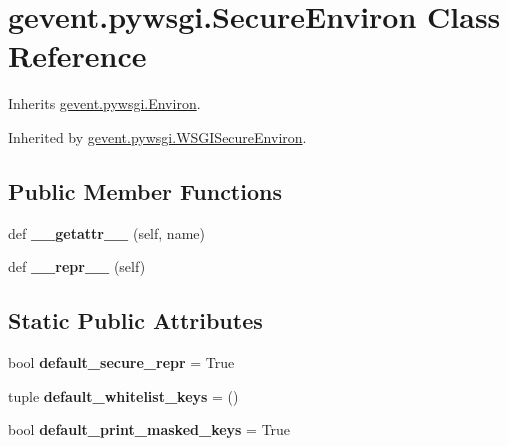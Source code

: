 \hypertarget{classgevent_1_1pywsgi_1_1_secure_environ}{}\section{gevent.\+pywsgi.\+Secure\+Environ Class Reference}
\label{classgevent_1_1pywsgi_1_1_secure_environ}


Inherits \hyperlink{classgevent_1_1pywsgi_1_1_environ}{gevent.\+pywsgi.\+Environ}.



Inherited by \hyperlink{classgevent_1_1pywsgi_1_1_w_s_g_i_secure_environ}{gevent.\+pywsgi.\+W\+S\+G\+I\+Secure\+Environ}.

\subsection*{Public Member Functions}
\begin{DoxyCompactItemize}
\item 
\mbox{\label{classgevent_1_1pywsgi_1_1_secure_environ_a4836fd508c8b8640276ef733259da0f0}} 
def {\bfseries \+\_\+\+\_\+getattr\+\_\+\+\_\+} (self, name)
\item 
\mbox{\label{classgevent_1_1pywsgi_1_1_secure_environ_a43ac82bb49bc974de6f361b47ae7c91e}} 
def {\bfseries \+\_\+\+\_\+repr\+\_\+\+\_\+} (self)
\end{DoxyCompactItemize}
\subsection*{Static Public Attributes}
\begin{DoxyCompactItemize}
\item 
\mbox{\label{classgevent_1_1pywsgi_1_1_secure_environ_ad8b424808555705d3cc808e2e7982620}} 
bool {\bfseries default\+\_\+secure\+\_\+repr} = True
\item 
\mbox{\label{classgevent_1_1pywsgi_1_1_secure_environ_a8047b2fa7f04237d54ea53c12a5de6a4}} 
tuple {\bfseries default\+\_\+whitelist\+\_\+keys} = ()
\item 
\mbox{\label{classgevent_1_1pywsgi_1_1_secure_environ_a295b5ba43eb65c421f3bb099ae5a23fa}} 
bool {\bfseries default\+\_\+print\+\_\+masked\+\_\+keys} = True
\end{DoxyCompactItemize}


